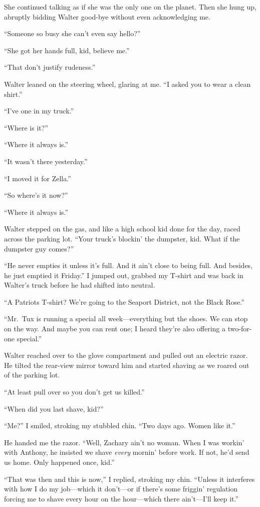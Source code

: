 She continued talking as if she was the only one on the planet. Then she
hung up, abruptly bidding Walter good-bye without even acknowledging me.

``Someone so busy she can't even say hello?''

``She got her hands full, kid, believe me.''

``That don't justify rudeness.''

Walter leaned on the steering wheel, glaring at me. ``I asked you to
wear a clean shirt.''

``I've one in my truck.''

``Where is it?''

``Where it always is.''

``It wasn't there yesterday.''

``I moved it for Zella.''

``So where's it now?''

``Where it always is.''

Walter stepped on the gas, and like a high school kid done for the day,
raced across the parking lot. ``Your truck's blockin' the dumpster, kid.
What if the dumpster guy comes?''

``He never empties it unless it's full. And it ain't close to being
full. And besides, he just emptied it Friday.'' I jumped out, grabbed my
T-shirt and was back in Walter's truck before he had shifted into
neutral.

``A Patriots T-shirt? We're going to the Seaport District, not the Black
Rose.''

``Mr.~Tux is running a special all week---everything but the shoes. We
can stop on the way. And maybe you can rent one; I heard they're also
offering a two-for-one special.''

Walter reached over to the glove compartment and pulled out an electric
razor. He tilted the rear-view mirror toward him and started shaving as
we roared out of the parking lot.

``At least pull over so you don't get us killed.''

``When did you last shave, kid?''

``Me?'' I smiled, stroking my stubbled chin. ``Two days ago. Women like
it.''

He handed me the razor. ``Well, Zachary ain't no woman. When I was
workin' with Anthony, he insisted we shave \emph{every} mornin' before
work. If not, he'd send us home. Only happened once, kid.''

``That was then and this is now,'' I replied, stroking my chin. ``Unless
it interferes with how I do my job---which it don't---or if there's some
friggin' regulation forcing me to shave every hour on the hour---which
there ain't---I'll keep it.''

